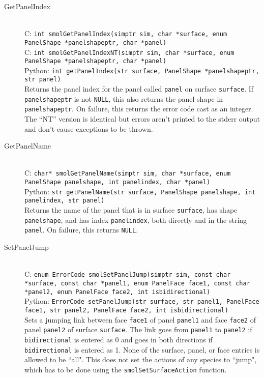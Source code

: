 \documentclass {book}
\newcommand {\ttt} {\texttt}
\begin{document}
\begin{description}
\item[GetPanelIndex]
\hfill \\
C: \ttt{int smolGetPanelIndex(simptr sim, char *surface, enum PanelShape *panelshapeptr, char *panel)}\\
C: \ttt{int smolGetPanelIndexNT(simptr sim, char *surface, enum PanelShape *panelshapeptr, char *panel)}\\
Python: \ttt{int getPanelIndex(str surface, PanelShape *panelshapeptr, str panel)}\\
Returns the panel index for the panel called \ttt{panel} on surface \ttt{surface}. If \ttt{panelshapeptr} is not \ttt{NULL}, this also returns the panel shape in \ttt{panelshapeptr}. On failure, this returns the error code cast as an integer. The ``NT'' version is identical but errors aren't printed to the stderr output and don't cause exceptions to be thrown.

\item[GetPanelName]
\hfill \\
C: \ttt{char* smolGetPanelName(simptr sim, char *surface, enum PanelShape panelshape, int panelindex, char *panel)}\\
Python: \ttt{str getPanelName(str surface, PanelShape panelshape, int panelindex, str panel)}\\
Returns the name of the panel that is in surface \ttt{surface}, has shape \ttt{panelshape}, and has index \ttt{panelindex}, both directly and in the string \ttt{panel}. On failure, this returns \ttt{NULL}.

\item[SetPanelJump]
\hfill \\
C: \ttt{enum ErrorCode smolSetPanelJump(simptr sim, const char *surface, const char *panel1, enum PanelFace face1, const char *panel2, enum PanelFace face2, int isbidirectional)}\\
Python: \ttt{ErrorCode setPanelJump(str surface, str panel1, PanelFace face1, str panel2, PanelFace face2, int isbidirectional)}\\
Sets a jumping link between face \ttt{face1} of panel \ttt{panel1} and face \ttt{face2} of panel \ttt{panel2} of surface \ttt{surface}. The link goes from \ttt{panel1} to \ttt{panel2} if \ttt{bidirectional} is entered as 0 and goes in both directions if \ttt{bidirectional} is entered as 1. None of the surface, panel, or face entries is allowed to be ``all". This does not set the actions of any species to ``jump", which has to be done using the \ttt{smolSetSurfaceAction} function.


\end{description}
\end{document}
